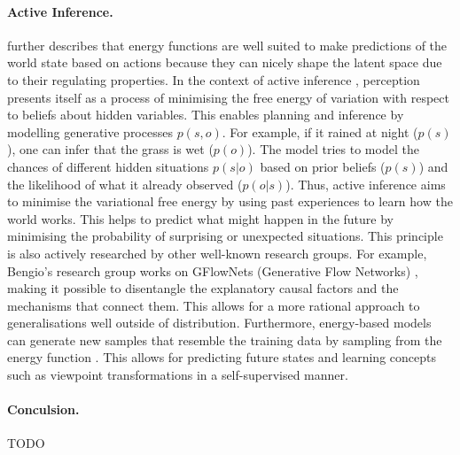 \paragraph{Active Inference.}  further describes that energy functions are well suited to make predictions of the world state based on actions because they can nicely shape the latent space due to their regulating properties.
In the context of active inference , perception presents itself as a process of minimising the free energy of variation with respect to beliefs about hidden variables. This enables planning and inference by modelling generative processes $p(s,o)$. For example, if it rained at night ($p(s)$), one can infer that the grass is wet ($p(o)$). The model tries to model the chances of different hidden situations $p(s|o)$ based on prior beliefs ($p(s)$) and the likelihood of what it already observed ($p(o|s)$). 
Thus, active inference aims to minimise the variational free energy by using past experiences to learn how the world works. This helps to predict what might happen in the future by minimising the probability of surprising or unexpected situations.
This principle is also actively researched by other well-known research groups. For example, Bengio's research group works on GFlowNets (Generative Flow Networks) , making it possible to disentangle the explanatory causal factors and the mechanisms that connect them. This allows for a more rational approach to generalisations well outside of distribution.
Furthermore, energy-based models can generate new samples that resemble the training data by sampling from the energy function . This allows for predicting future states and learning concepts such as viewpoint transformations in a self-supervised manner.


















\paragraph{Conculsion.} TODO

